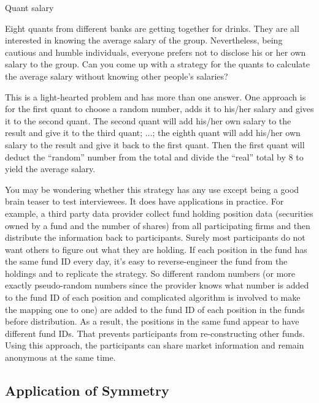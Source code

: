 \begin{problem}{Quant salary}

Eight quants from different banks are getting together for drinks. They are all interested
in knowing the average salary of the group. Nevertheless, being cautious and humble
individuals, everyone prefers not to disclose his or her own salary to the group. Can you
come up with a strategy for the quants to calculate the average salary without knowing
other people's salaries?
\end{problem}

\begin{solution}

This is a light-hearted problem and has more than one answer. One approach is for the
first quant to choose a random number, adds it to his/her salary and gives it to the
second quant. The second quant will add his/her own salary to the result and give it to the
third quant; $\ldots$; the eighth quant will add his/her own salary to the result and give it
back to the first quant. Then the first quant will deduct the ``random'' number from the
total and divide the ``real'' total by 8 to yield the average salary.

You may be wondering whether this strategy has any use except being a good brain
teaser to test interviewees. It does have applications in practice. For example, a third
party data provider collect fund holding position data (securities owned by a fund and
the number of shares) from all participating firms and then distribute the information
back to participants. Surely most participants do not want others to figure out what they
are holding. If each position in the fund has the same fund ID every day, it's easy to
reverse-engineer the fund from the holdings and to replicate the strategy. So different
random numbers (or more exactly pseudo-random numbers since the provider knows
what number is added to the fund ID of each position and complicated algorithm is
involved to make the mapping one to one) are added to the fund ID of each position in
the funds before distribution. As a result, the positions in the same fund appear to have
different fund IDs. That prevents participants from re-constructing other funds. Using
this approach, the participants can share market information and remain anonymous at
the same time.
\end{solution}

\subsection{Application of Symmetry}

